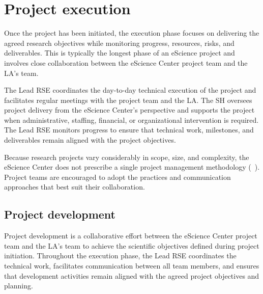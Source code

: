 \section{Project execution}
\label{sec:execution}
Once the project has been initiated, the execution phase focuses on delivering the agreed research objectives while 
monitoring progress, resources, risks, and deliverables. This is typically the longest phase of an eScience project 
and involves close collaboration between the eScience Center project team and the LA's team.

The Lead RSE coordinates the day-to-day technical execution of the project and facilitates regular meetings with the 
project team and the LA. The SH oversees project delivery from the eScience Center's perspective and supports the 
project when administrative, staffing, financial, or organizational intervention is required. The Lead RSE monitors 
progress to ensure that technical work, milestones, and deliverables remain aligned with the project objectives.

Because research projects vary considerably in scope, size, and complexity, the eScience Center does not prescribe a 
single project management methodology (~\cite{the_turing_way-2023, scrum-guide, agilefirst2024shapeup, microp3, 
beck2004xp, wilson2014best}). Project teams are encouraged to adopt the practices and communication approaches that 
best suit their collaboration.

\subsection{Project development}
\label{sec:exec:development}
Project development is a collaborative effort between the eScience Center project team and the LA's team to achieve 
the scientific objectives defined during project initiation. Throughout the execution phase, the Lead RSE coordinates 
the technical work, facilitates communication between all team members, and ensures that development activities remain 
aligned with the agreed project objectives and planning.


